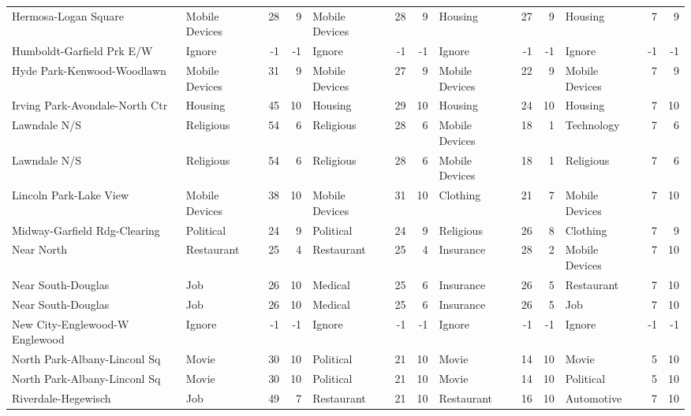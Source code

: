 \begin{tabular}[htbp]
\begin{tabular}{llrrlrrlrrlrr}
    Hermosa-Logan Square & Mobile Devices & 28    & 9     & Mobile Devices & 28    & 9     & Housing & 27    & 9     & Housing & 7     & 9 \\
    Humboldt-Garfield Prk E/W & Ignore & -1    & -1    & Ignore & -1    & -1    & Ignore & -1    & -1    & Ignore & -1    & -1 \\
    Hyde Park-Kenwood-Woodlawn & Mobile Devices & 31    & 9     & Mobile Devices & 27    & 9     & Mobile Devices & 22    & 9     & Mobile Devices & 7     & 9 \\
    Irving Park-Avondale-North Ctr & Housing & 45    & 10    & Housing & 29    & 10    & Housing & 24    & 10    & Housing & 7     & 10 \\
    Lawndale N/S & Religious & 54    & 6     & Religious & 28    & 6     & Mobile Devices & 18    & 1     & Technology & 7     & 6 \\
    Lawndale N/S & Religious & 54    & 6     & Religious & 28    & 6     & Mobile Devices & 18    & 1     & Religious & 7     & 6 \\
    Lincoln Park-Lake View & Mobile Devices & 38    & 10    & Mobile Devices & 31    & 10    & Clothing & 21    & 7     & Mobile Devices & 7     & 10 \\
    Midway-Garfield Rdg-Clearing & Political & 24    & 9     & Political & 24    & 9     & Religious & 26    & 8     & Clothing & 7     & 9 \\
    Near North & Restaurant & 25    & 4     & Restaurant & 25    & 4     & Insurance & 28    & 2     & Mobile Devices & 7     & 10 \\
    Near South-Douglas & Job   & 26    & 10    & Medical & 25    & 6     & Insurance & 26    & 5     & Restaurant & 7     & 10 \\
    Near South-Douglas & Job   & 26    & 10    & Medical & 25    & 6     & Insurance & 26    & 5     & Job   & 7     & 10 \\
    New City-Englewood-W Englewood & Ignore & -1    & -1    & Ignore & -1    & -1    & Ignore & -1    & -1    & Ignore & -1    & -1 \\
    North Park-Albany-Linconl Sq & Movie & 30    & 10    & Political & 21    & 10    & Movie & 14    & 10    & Movie & 5     & 10 \\
    North Park-Albany-Linconl Sq & Movie & 30    & 10    & Political & 21    & 10    & Movie & 14    & 10    & Political & 5     & 10 \\
    Riverdale-Hegewisch & Job   & 49    & 7     & Restaurant & 21    & 10    & Restaurant & 16    & 10    & Automotive & 7     & 10 \\

\end{tabular}
\end{tabular}
